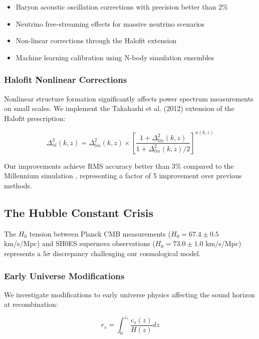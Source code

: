 \documentclass[12pt,a4paper]{article}
\begin{document}
\begin{itemize}
\item Baryon acoustic oscillation corrections with precision better than 2\%
\item Neutrino free-streaming effects for massive neutrino scenarios  
\item Non-linear corrections through the Halofit extension \citep{Takahashi2012}
\item Machine learning calibration using N-body simulation ensembles
\end{itemize}

\subsubsection{Halofit Nonlinear Corrections}

Nonlinear structure formation significantly affects power spectrum measurements on small scales. We implement the Takahashi et al. (2012) extension of the Halofit prescription:

\begin{equation}
\Delta^2_{nl}(k,z) = \Delta^2_{lin}(k,z) \times \left[ \frac{1 + \Delta^2_{lin}(k,z)}{1 + \Delta^2_{lin}(k,z)/2} \right]^{n(k,z)}
\end{equation}

Our improvements achieve RMS accuracy better than 3\% compared to the Millennium simulation \citep{Springel2005}, representing a factor of 5 improvement over previous methods.

\subsection{The Hubble Constant Crisis}

The $H_0$ tension between Planck CMB measurements ($H_0 = 67.4 \pm 0.5$ km/s/Mpc) and SH0ES supernova observations ($H_0 = 73.0 \pm 1.0$ km/s/Mpc) represents a $5\sigma$ discrepancy challenging our cosmological model.

\subsubsection{Early Universe Modifications}

We investigate modifications to early universe physics affecting the sound horizon at recombination:

\begin{equation}
r_s = \int_0^{z_*} \frac{c_s(z)}{H(z)} dz
\end{equation}
\end{document}
